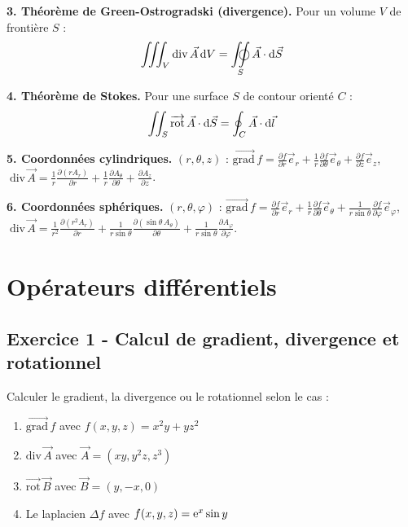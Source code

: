 \documentclass[12pt,a4paper]{article}
\begin{document}
\begin{boiteresume}
\textbf{3. Théorème de Green-Ostrogradski (divergence).} Pour un volume $V$ de frontière $S$ :
\[
\iiint_V \text{div}\,\vec{A}\,\d V = \oiint_S \vec{A}\cdot\d\vec{S}
\]

\textbf{4. Théorème de Stokes.} Pour une surface $S$ de contour orienté $C$ :
\[
\iint_S \overrightarrow{\text{rot}}\,\vec{A}\cdot\mathrm{d}\vec{S} = \oint_C \vec{A}\cdot\mathrm{d}\vec{l}
\]

\textbf{5. Coordonnées cylindriques.} $(r,\theta,z)$ : $\overrightarrow{\text{grad}}\,f = \frac{\partial f}{\partial r}\vec{e}_r + \frac{1}{r}\frac{\partial f}{\partial\theta}\vec{e}_\theta + \frac{\partial f}{\partial z}\vec{e}_z$, $\;\text{div}\,\vec{A} = \frac{1}{r}\frac{\partial(rA_r)}{\partial r}+\frac{1}{r}\frac{\partial A_\theta}{\partial\theta}+\frac{\partial A_z}{\partial z}$.

\textbf{6. Coordonnées sphériques.} $(r,\theta,\varphi)$ : $\overrightarrow{\text{grad}}\,f = \frac{\partial f}{\partial r}\vec{e}_r + \frac{1}{r}\frac{\partial f}{\partial\theta}\vec{e}_\theta + \frac{1}{r\sin\theta}\frac{\partial f}{\partial\varphi}\vec{e}_\varphi$, $\;\text{div}\,\vec{A} = \frac{1}{r^2}\frac{\partial(r^2A_r)}{\partial r}+\frac{1}{r\sin\theta}\frac{\partial(\sin\theta\,A_\theta)}{\partial\theta}+\frac{1}{r\sin\theta}\frac{\partial A_\varphi}{\partial\varphi}$.

\end{boiteresume}

\newpage
\section{Opérateurs différentiels}

\subsection*{Exercice 1 - Calcul de gradient, divergence et rotationnel \niveau{\facile}}

\begin{boiteexercice}
Calculer le gradient, la divergence ou le rotationnel selon le cas :
\begin{enumerate}[label=(\alph*)]
  \item $\overrightarrow{\text{grad}}\,f$ avec $f(x,y,z) = x^2y + yz^2$
  \item $\text{div}\,\vec{A}$ avec $\vec{A} = (xy, y^2z, z^3)$
  \item $\overrightarrow{\text{rot}}\,\vec{B}$ avec $\vec{B} = (y, -x, 0)$
  \item Le laplacien $\Delta f$ avec $f(x,y,z) = \mathrm{e}^x\sin y$
\end{enumerate}
\end{boiteexercice}
\end{document}
